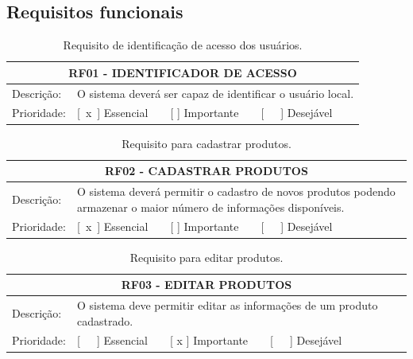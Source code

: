 
\begin{anexosenv}
	
	\partanexos
	
	\chapter{Requisitos funcionais}
	
	\begin{table}[htbp]
\centering
\caption{Requisito de identificação de acesso dos usuários.}
\label{tab:rf01}
\begin{tabular}{l p{10cm}}
\toprule
\multicolumn{2}{c}{RF01 - IDENTIFICADOR DE ACESSO} \\ \midrule
Descrição:  & O sistema deverá ser capaz de identificar o usuário local.  \\ \midrule
Prioridade: & [ x ] Essencial    [   ] Importante    [   ] Desejável \\ \bottomrule
\end{tabular}
\end{table}


\begin{table}[htbp]
\centering
\caption{Requisito para cadastrar produtos.}
\label{tab:rf02}
\begin{tabular}{l p{10cm}}
\toprule
\multicolumn{2}{c}{RF02 - CADASTRAR PRODUTOS} \\ \midrule
Descrição:  & O sistema deverá permitir o cadastro de novos produtos podendo armazenar o maior número de informações disponíveis.\\ \midrule
Prioridade: & [ x ] Essencial    [   ] Importante    [   ] Desejável \\ \bottomrule
\end{tabular}
\end{table}

\begin{table}[htbp]
\centering
\caption{Requisito para editar produtos.}
\label{tab:rf03}
\begin{tabular}{l p{10cm}}
\toprule
\multicolumn{2}{c}{RF03 - EDITAR PRODUTOS} \\ \midrule
Descrição:  & O sistema deve permitir editar as informações de um produto cadastrado.\\ \midrule
Prioridade: & [   ] Essencial    [ x ] Importante    [   ] Desejável \\ \bottomrule
\end{tabular}
\end{table}


\end{anexosenv}

